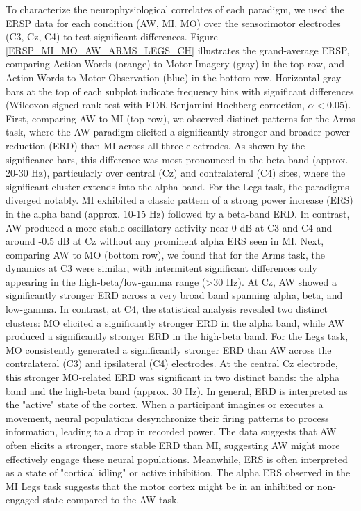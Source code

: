 \documentclass[10pt,letterpaper]{article}
\begin{document}
To characterize the neurophysiological correlates of each paradigm, we used the ERSP data for each condition (AW, MI, MO) over the sensorimotor electrodes (C3, Cz, C4) to test significant differences. Figure \ref{ERSP_MI_MO_AW_ARMS_LEGS_CH} illustrates the grand-average ERSP, comparing Action Words (orange) to Motor Imagery (gray) in the top row, and Action Words to Motor Observation (blue) in the bottom row. Horizontal gray bars at the top of each subplot indicate frequency bins with significant differences (Wilcoxon signed-rank test with FDR Benjamini-Hochberg correction, $\alpha <0.05$). First, comparing AW to MI (top row), we observed distinct patterns for the Arms task, where the AW paradigm elicited a significantly stronger and broader power reduction (ERD) than MI across all three electrodes. As shown by the significance bars, this difference was most pronounced in the beta band (approx. 20-30 Hz), particularly over central (Cz) and contralateral (C4) sites, where the significant cluster extends into the alpha band. For the Legs task, the paradigms diverged notably. MI exhibited a classic pattern of a strong power increase (ERS) in the alpha band (approx. 10-15 Hz) followed by a beta-band ERD. In contrast, AW produced a more stable oscillatory activity near 0 dB at C3 and C4 and around -0.5 dB at Cz without any prominent alpha ERS seen in MI. Next, comparing AW to MO (bottom row), we found that for the Arms task, the dynamics at C3 were similar, with intermitent significant differences only appearing in the high-beta/low-gamma range (>30 Hz). At Cz, AW showed a significantly stronger ERD across a very broad band spanning alpha, beta, and low-gamma. In contrast, at C4, the statistical analysis revealed two distinct clusters: MO elicited a significantly stronger ERD in the alpha band, while AW produced a significantly stronger ERD in the high-beta band. For the Legs task, MO consistently generated a significantly stronger ERD than AW across the contralateral (C3) and ipsilateral (C4) electrodes. At the central Cz electrode, this stronger MO-related ERD was significant in two distinct bands: the alpha band and the high-beta band (approx. 30 Hz). In general, ERD is interpreted as the "active" state of the cortex. When a participant imagines or executes a movement, neural populations desynchronize their firing patterns to process information, leading to a drop in recorded power. The data suggests that AW often elicits a stronger, more stable ERD than MI, suggesting AW might more effectively engage these neural populations. Meanwhile, ERS is often interpreted as a state of "cortical idling" or active inhibition. The alpha ERS observed in the MI Legs task suggests that the motor cortex might be in an inhibited or non-engaged state compared to the AW task.
\end{document}
